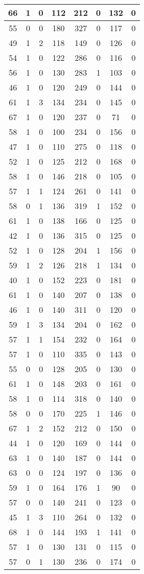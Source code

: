 \documentclass{article}
\begin{document}
\begin{longtable}{|c|c|c|c|c|c|c|c|}
66 & 1 & 0 & 112 & 212 & 0 & 132 & 0 \\ \hline
55 & 0 & 0 & 180 & 327 & 0 & 117 & 0 \\ \hline
49 & 1 & 2 & 118 & 149 & 0 & 126 & 0 \\ \hline
54 & 1 & 0 & 122 & 286 & 0 & 116 & 0 \\ \hline
56 & 1 & 0 & 130 & 283 & 1 & 103 & 0 \\ \hline
46 & 1 & 0 & 120 & 249 & 0 & 144 & 0 \\ \hline
61 & 1 & 3 & 134 & 234 & 0 & 145 & 0 \\ \hline
67 & 1 & 0 & 120 & 237 & 0 & 71 & 0 \\ \hline
58 & 1 & 0 & 100 & 234 & 0 & 156 & 0 \\ \hline
47 & 1 & 0 & 110 & 275 & 0 & 118 & 0 \\ \hline
52 & 1 & 0 & 125 & 212 & 0 & 168 & 0 \\ \hline
58 & 1 & 0 & 146 & 218 & 0 & 105 & 0 \\ \hline
57 & 1 & 1 & 124 & 261 & 0 & 141 & 0 \\ \hline
58 & 0 & 1 & 136 & 319 & 1 & 152 & 0 \\ \hline
61 & 1 & 0 & 138 & 166 & 0 & 125 & 0 \\ \hline
42 & 1 & 0 & 136 & 315 & 0 & 125 & 0 \\ \hline
52 & 1 & 0 & 128 & 204 & 1 & 156 & 0 \\ \hline
59 & 1 & 2 & 126 & 218 & 1 & 134 & 0 \\ \hline
40 & 1 & 0 & 152 & 223 & 0 & 181 & 0 \\ \hline
61 & 1 & 0 & 140 & 207 & 0 & 138 & 0 \\ \hline
46 & 1 & 0 & 140 & 311 & 0 & 120 & 0 \\ \hline
59 & 1 & 3 & 134 & 204 & 0 & 162 & 0 \\ \hline
57 & 1 & 1 & 154 & 232 & 0 & 164 & 0 \\ \hline
57 & 1 & 0 & 110 & 335 & 0 & 143 & 0 \\ \hline
55 & 0 & 0 & 128 & 205 & 0 & 130 & 0 \\ \hline
61 & 1 & 0 & 148 & 203 & 0 & 161 & 0 \\ \hline
58 & 1 & 0 & 114 & 318 & 0 & 140 & 0 \\ \hline
58 & 0 & 0 & 170 & 225 & 1 & 146 & 0 \\ \hline
67 & 1 & 2 & 152 & 212 & 0 & 150 & 0 \\ \hline
44 & 1 & 0 & 120 & 169 & 0 & 144 & 0 \\ \hline
63 & 1 & 0 & 140 & 187 & 0 & 144 & 0 \\ \hline
63 & 0 & 0 & 124 & 197 & 0 & 136 & 0 \\ \hline
59 & 1 & 0 & 164 & 176 & 1 & 90 & 0 \\ \hline
57 & 0 & 0 & 140 & 241 & 0 & 123 & 0 \\ \hline
45 & 1 & 3 & 110 & 264 & 0 & 132 & 0 \\ \hline
68 & 1 & 0 & 144 & 193 & 1 & 141 & 0 \\ \hline
57 & 1 & 0 & 130 & 131 & 0 & 115 & 0 \\ \hline
57 & 0 & 1 & 130 & 236 & 0 & 174 & 0 \\ \hline
\end{longtable}
\end{document}
